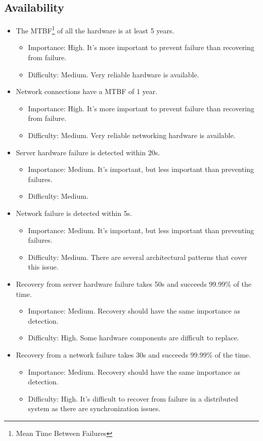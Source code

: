 \documentclass[a4paper,11pt]{report}
\begin{document}
\subsection{Availability}
\begin{itemize}
\item[\textbf{A1.1}] The MTBF\footnote{Mean Time Between Failures} of all the hardware is at least 5 years.
\begin{itemize}
\item Importance: High. It's more important to prevent failure than recovering from failure.
\item Difficulty: Medium. Very reliable hardware is available.
\end{itemize}
\item[\textbf{A1.2}] Network connections have a MTBF of 1 year.
\begin{itemize}
\item Importance: High. It's more important to prevent failure than recovering from failure.
\item Difficulty: Medium. Very reliable networking hardware is available.
\end{itemize}
\item[\textbf{A2.1}] Server hardware failure is detected within 20s.
\begin{itemize}
\item Importance: Medium. It's important, but less important than preventing failures.
\item Difficulty: Medium.
\end{itemize}
\item[\textbf{A2.2}] Network failure is detected within 5s.
\begin{itemize}
\item Importance: Medium. It's important, but less important than preventing failures.
\item Difficulty: Medium. There are several architectural patterns that cover this issue.
\end{itemize}
\item[\textbf{A3.1}] Recovery from server hardware failure takes 50s and succeeds 99.99\% of the time.
\begin{itemize}
\item Importance: Medium. Recovery should have the same importance as detection.
\item Difficulty: High. Some hardware components are difficult to replace.
\end{itemize}
\item[\textbf{A3.2}] Recovery from a network failure takes 30s and succeeds 99.99\% of the time.
\begin{itemize}
\item Importance: Medium. Recovery should have the same importance as detection.
\item Difficulty: High. It's difficult to recover from failure in a distributed system as there are synchronization issues.
\end{itemize}
\end{itemize}
\end{document}
